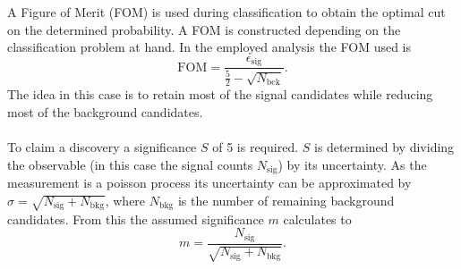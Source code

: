 A Figure of Merit (FOM) is used during classification to obtain the optimal cut on the determined probability. A FOM is constructed depending on the classification problem at hand. In the employed analysis the FOM used is 
\begin{equation}
	\mathrm{FOM} = \frac{\epsilon_\mathrm{sig}}{\frac{5}{2}-\sqrt{N_\mathrm{bck}}}.
	\label{eq:fom}
\end{equation}
The idea in this case is to retain most of the signal candidates while reducing most of the background candidates. \\
\\

To claim a discovery a significance $S$ of 5 is required. $S$ is determined by dividing the observable (in this case the signal counts $N_\mathrm{sig}$) by its uncertainty. As the measurement is a poisson process its uncertainty can be approximated by $\sigma = \sqrt{N_\mathrm{sig} + N_\mathrm{bkg}}$, where $N_\mathrm{bkg}$ is the number of remaining background candidates. From this the assumed significance $m$ calculates to
\begin{equation}
	m = \frac{N_\mathrm{sig}}{\sqrt{N_\mathrm{sig} + N_\mathrm{bkg}}}.
\end{equation}

 



















